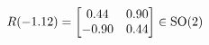 \documentclass[preview]{standalone}
\begin{document}
\begin{align*}
\special{dvisvgm:raw <g id='unique000'>}R(-1.12) = \begin{bmatrix} 0.44 & 0.90 \\ -0.90 & 0.44 \end{bmatrix} \in \text{SO}(2)\special{dvisvgm:raw </g>}
\end{align*}
\end{document}
